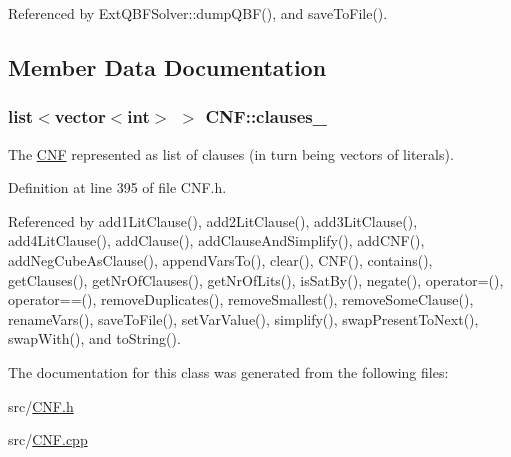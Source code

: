 Referenced by Ext\-Q\-B\-F\-Solver\-::dump\-Q\-B\-F(), and save\-To\-File().



\subsection{Member Data Documentation}
\hypertarget{classCNF_acc8cc195dc20d00c47d6a2282b45a612}{
\subsubsection[{clauses\-\_\-}]{\setlength{\rightskip}{0pt plus 5cm}list$<$vector$<$int$>$ $>$ C\-N\-F\-::clauses\-\_\-\hspace{0.3cm}{\ttfamily [protected]}}}\label{classCNF_acc8cc195dc20d00c47d6a2282b45a612}


The \hyperlink{classCNF}{C\-N\-F} represented as list of clauses (in turn being vectors of literals). 



Definition at line 395 of file C\-N\-F.\-h.



Referenced by add1\-Lit\-Clause(), add2\-Lit\-Clause(), add3\-Lit\-Clause(), add4\-Lit\-Clause(), add\-Clause(), add\-Clause\-And\-Simplify(), add\-C\-N\-F(), add\-Neg\-Cube\-As\-Clause(), append\-Vars\-To(), clear(), C\-N\-F(), contains(), get\-Clauses(), get\-Nr\-Of\-Clauses(), get\-Nr\-Of\-Lits(), is\-Sat\-By(), negate(), operator=(), operator==(), remove\-Duplicates(), remove\-Smallest(), remove\-Some\-Clause(), rename\-Vars(), save\-To\-File(), set\-Var\-Value(), simplify(), swap\-Present\-To\-Next(), swap\-With(), and to\-String().



The documentation for this class was generated from the following files\-:\begin{DoxyCompactItemize}
\item 
src/\hyperlink{CNF_8h}{C\-N\-F.\-h}\item 
src/\hyperlink{CNF_8cpp}{C\-N\-F.\-cpp}\end{DoxyCompactItemize}
